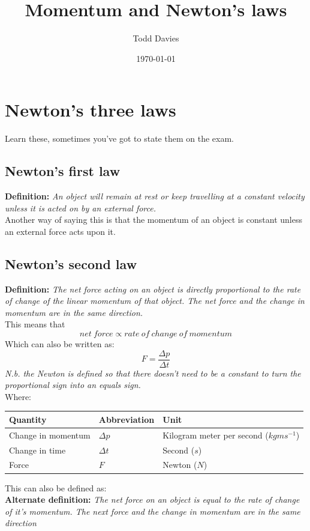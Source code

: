 \documentclass{article}
\title{Momentum and Newton's laws}
\author{Todd Davies}
\date{\today}
\begin{document}
\lhead{\today}

\maketitle

\section*{Newton's three laws}
\thispagestyle{empty}
\label{sec:NewtonSThreeLaws}
Learn these, sometimes you've got to state them on the exam.
\subsection*{Newton's first law}
\textbf{Definition:} \textit{An object will remain at rest or keep travelling at a constant velocity unless it is acted on by an external force.}\\
Another way of saying this is that the momentum of an object is constant unless an external force acts upon it.
\subsection*{Newton's second law}
\textbf{Definition:} \textit{The net force acting on an object is directly proportional to the rate of change of the linear momentum of that object. The net force and the change in momentum are in the same direction.}\\
This means that 
\[
	net\:force \propto rate\:of\:change\:of\:momentum
\]
Which can also be written as:
\[
	F = \frac{\Delta p}{\Delta t}
\]
\textit{N.b. the Newton is defined so that there doesn't need to be a constant to turn the proportional sign into an equals sign.}\\
Where:
\begin{center}
	\begin{tabular}{|l|l|l|}
		\hline
			Quantity & Abbreviation & Unit \\ \hline
			Change in momentum & $\Delta p$ & Kilogram meter per second ($kgms^{-1}$) \\ \hline
			Change in time & $\Delta t$ & Second ($s$) \\ \hline
			Force & $F$ & Newton ($N$) \\ \hline
	\end{tabular}
\end{center}
This can also be defined as:\\
\textbf{Alternate definition:} \textit{The net force on an object is equal to the rate of change of it's momentum. The next force and the change in momentum are in the same direction}
\end{document}
